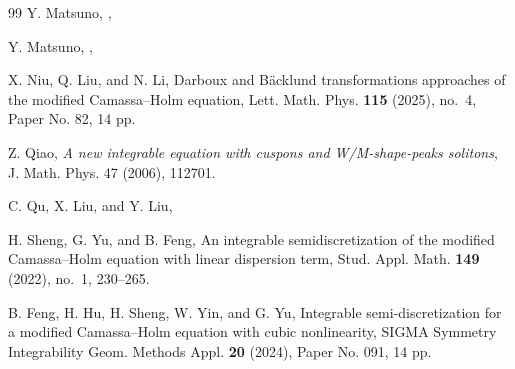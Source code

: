 \documentclass[11pt]{article}
\numberwithin{equation}{section}
\begin{document}
\begin{thebibliography}{99}
Y. Matsuno,
,


Y. Matsuno,
,







X. Niu, Q. Liu, and N. Li, Darboux and B\"acklund transformations approaches of the modified Camassa--Holm equation, Lett. Math. Phys. {\bf 115} (2025), no.~4, Paper No. 82, 14 pp.

Z. Qiao, {\em A new integrable equation with cuspons and W/M-shape-peaks solitons}, J. Math. Phys. 47 (2006), 112701.

C. Qu, X. Liu, and Y. Liu,

H. Sheng, G. Yu, and B. Feng, An integrable semidiscretization of the modified Camassa--Holm equation with linear dispersion term, Stud. Appl. Math. {\bf 149} (2022), no.~1, 230--265.

B. Feng, H. Hu, H. Sheng, W. Yin, and G. Yu, Integrable semi-discretization for a modified Camassa--Holm equation with cubic nonlinearity, SIGMA Symmetry Integrability Geom. Methods Appl. {\bf 20} (2024), Paper No. 091, 14 pp.




\end{thebibliography}
\end{document}
